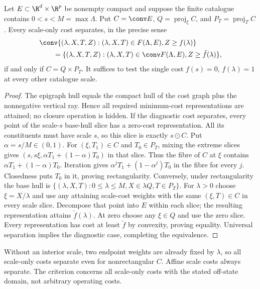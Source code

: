 \begin{proposition}\label{prop:scale-rectangularity}
Let $E\subset\R^d\times\R^p$ be nonempty compact and suppose the finite
catalogue contains $0<s<M=\max\Lambda$. Put $C=\conv E$,
$Q=\operatorname{proj}_\xi C$, and $P_T=\operatorname{proj}_T C$.
Every scale-only cost separates, in the precise sense
\begin{equation}\label{eq:scale-cost-separation}
 \begin{split}
 &\conv\{(\lambda,X,T,Z):(\lambda,X,T)\in F(\Lambda,E),Z\ge f(\lambda)\}\\
 &\qquad=\{(\lambda,X,T,Z):(\lambda,X,T)\in\conv F(\Lambda,E),
                         Z\ge\check f(\lambda)\},
 \end{split}
\end{equation}
if and only if $C=Q\times P_T$. It suffices to test the single cost
$f(s)=0$, $f(\lambda)=1$ at every other catalogue scale.
\end{proposition}
\begin{proof}
The epigraph hull equals the compact hull of the cost graph plus the
nonnegative vertical ray. Hence all required minimum-cost representations
are attained; no closure operation is hidden. If the diagnostic cost
separates, every point of the scale-$s$ base-hull slice has a zero-cost
representation. All its constituents must have scale $s$, so this slice
is exactly $s\odot C$. Put $\alpha=s/M\in(0,1)$. For
$(\xi,T_1)\in C$ and $T_0\in P_T$, mixing the extreme slices gives
$(s,s\xi,\alpha T_1+(1-\alpha)T_0)$ in that slice. Thus the fibre of
$C$ at $\xi$ contains $\alpha T_1+(1-\alpha)T_0$. Iteration gives
$\alpha^jT_1+(1-\alpha^j)T_0$ in the fibre for every $j$. Closedness
puts $T_0$ in it, proving rectangularity.
Conversely, under rectangularity the base hull is
$\{(\lambda,X,T):0\le\lambda\le M,X\in\lambda Q,T\in P_T\}$.
For $\lambda>0$ choose $\xi=X/\lambda$ and use any attaining scale-cost
weights with the same $(\xi,T)\in C$ in every scale slice. Decompose
that point into $E$ within each slice; the resulting representation
attains $\check f(\lambda)$. At zero choose any $\xi\in Q$ and use
the zero slice. Every representation has cost at least $\check f$ by
convexity, proving equality. Universal separation implies the diagnostic
case, completing the equivalence.
\end{proof}
Without an interior scale, two endpoint weights are already fixed by
$\lambda$, so all scale-only costs separate even for nonrectangular $C$.
Affine scale costs always separate. The criterion concerns all scale-only
costs with the stated off-state domain, not arbitrary operating costs.

